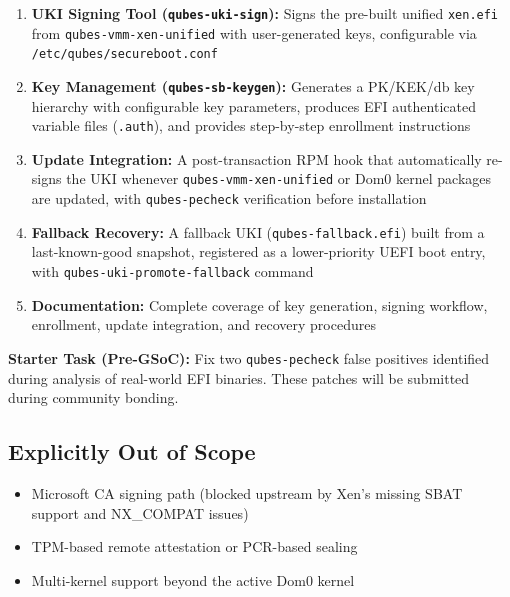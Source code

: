 \documentclass[12pt, a4paper]{article}
\begin{document}
\begin{enumerate}
    \item \textbf{UKI Signing Tool (\texttt{qubes-uki-sign}):} Signs the pre-built unified \texttt{xen.efi} from \texttt{qubes-vmm-xen-unified} with user-generated keys, configurable via \texttt{/etc/qubes/secureboot.conf}

    \item \textbf{Key Management (\texttt{qubes-sb-keygen}):} Generates a PK/KEK/db key hierarchy with configurable key parameters, produces EFI authenticated variable files (\texttt{.auth}), and provides step-by-step enrollment instructions

    \item \textbf{Update Integration:} A post-transaction RPM hook that automatically re-signs the UKI whenever \texttt{qubes-vmm-xen-unified} or Dom0 kernel packages are updated, with \texttt{qubes-pecheck} verification before installation

    \item \textbf{Fallback Recovery:} A fallback UKI (\texttt{qubes-fallback.efi}) built from a last-known-good snapshot, registered as a lower-priority UEFI boot entry, with \texttt{qubes-uki-promote-fallback} command

    \item \textbf{Documentation:} Complete coverage of key generation, signing workflow, enrollment, update integration, and recovery procedures
\end{enumerate}

\textbf{Starter Task (Pre-GSoC):} Fix two \texttt{qubes-pecheck} false positives identified during analysis of real-world EFI binaries. These patches will be submitted during community bonding.

\subsection*{Explicitly Out of Scope}

\begin{itemize}
    \item Microsoft CA signing path (blocked upstream by Xen's missing SBAT support and NX\_COMPAT issues)
    \item TPM-based remote attestation or PCR-based sealing
    \item Multi-kernel support beyond the active Dom0 kernel
\end{itemize}

\end{document}
